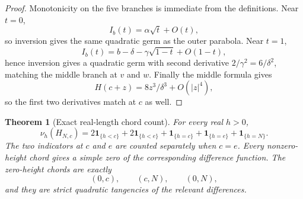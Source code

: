 \documentclass[11pt]{article}
\newtheorem{theorem}{Theorem}[section]
\theoremstyle{definition}
\theoremstyle{remark}
\newcommand{\ind}{\mathbf{1}}
\begin{document}
\begin{proof}
Monotonicity on the five branches is immediate from the definitions.
Near \(t=0\),
\[
I_b(t)=\alpha\sqrt t+O(t),
\]
so inversion gives the same quadratic germ as the outer parabola.
Near \(t=1\),
\[
I_b(t)=b-\delta-\gamma\sqrt{1-t}+O(1-t),
\]
hence inversion gives a quadratic germ with second derivative
\(2/\gamma^2=6/\delta^2\), matching the middle branch at \(v\) and
\(w\).  Finally the middle formula gives
\[
H(c+z)=8z^3/\delta^3+O(|z|^4),
\]
so the first two derivatives match at \(c\) as well.
\end{proof}

\begin{theorem}[Exact real-length chord count]\label{thm:real-count}
For every real \(h>0\),
\[
\nu_h(H_{N,c})
=
2\ind_{\{h<c\}}
+
2\ind_{\{h<e\}}
+
\ind_{\{h=c\}}
+
\ind_{\{h=e\}}
+
\ind_{\{h=N\}}.
\tag{6.2}\label{eq:real-count}
\]
The two indicators at \(c\) and \(e\) are counted separately when
\(c=e\).  Every nonzero-height chord gives a simple zero of the
corresponding difference function.  The zero-height chords are exactly
\[
(0,c),\qquad(c,N),\qquad(0,N),
\]
and they are strict quadratic tangencies of the relevant differences.
\end{theorem}
\end{document}
